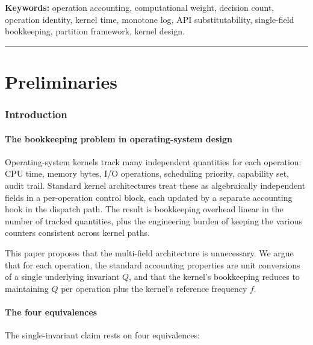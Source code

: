 \documentclass[twocolumn,11pt,a4paper]{article}
\newcommand{\Qweight}{Q}
\begin{document}
\noindent\textbf{Keywords:} operation accounting, computational weight, decision count, operation identity, kernel time, monotone log, API substitutability, single-field bookkeeping, partition framework, kernel design.

\tableofcontents

\vspace{6pt}
\hrule
\vspace{6pt}

\part{Preliminaries}

\section{Introduction}
\label{sec:intro}

\subsection{The bookkeeping problem in operating-system design}

Operating-system kernels track many independent quantities for each operation: CPU time, memory bytes, I/O operations, scheduling priority, capability set, audit trail. Standard kernel architectures \citep{tanenbaum2014modern, klein2009sel4} treat these as algebraically independent fields in a per-operation control block, each updated by a separate accounting hook in the dispatch path. The result is bookkeeping overhead linear in the number of tracked quantities, plus the engineering burden of keeping the various counters consistent across kernel paths.

This paper proposes that the multi-field architecture is unnecessary. We argue that for each operation, the standard accounting properties are unit conversions of a single underlying invariant $\Qweight$, and that the kernel's bookkeeping reduces to maintaining $\Qweight$ per operation plus the kernel's reference frequency $f$.

\subsection{The four equivalences}

The single-invariant claim rests on four equivalences:
\end{document}
